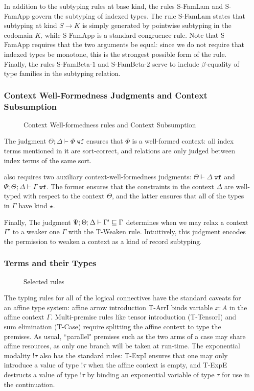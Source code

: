 In addition to the subtyping rules at base kind, the rules S-FamLam and S-FamApp govern the subtyping of indexed types. The rule S-FamLam states that subtyping at kind $S \to K$ is simply generated by pointwise subtyping in the codomain $K$, while S-FamApp is a standard congruence rule. Note that S-FamApp requires that the two arguments be equal: since we do not require that indexed types be monotone, this is the strongest possible form of the rule. Finally, the rules S-FamBeta-$1$ and S-FamBeta-$2$ serve to include $\beta$-equality of type families in the subtyping relation.

\subsubsection{Context Well-Formedness Judgments and Context Subsumption}
\begin{figure}

\caption{Context Well-formedness rules and Context Subsumption}
\label{fig:dlambdaamor-ctx-wf-rules}
\end{figure}
The judgment $\Theta ; \Delta \vdash \Phi \; \texttt{wf}$ ensures that $\Phi$ is a well-formed context: all index terms mentioned in it are sort-correct, and relations are only judged between index terms of the same sort.

\dlambdaamor also requires two auxiliary context-well-formedness judgments: $\Theta \vdash \Delta \; \texttt{wf}$ and $\Psi ; \Theta ; \Delta \vdash \Gamma \; \texttt{wf}$. The former ensures that the constraints in the context $\Delta$ are well-typed with respect to the context $\Theta$, and the latter ensures that all of the types in $\Gamma$ have kind $\star$.

Finally, The judgment $\Psi ; \Theta ; \Delta \vdash \Gamma' \sqsubseteq \Gamma$ determines when we may relax a context $\Gamma'$ to a weaker one $\Gamma$ with the T-Weaken rule. Intuitively, this judgment encodes the permission to weaken a context as a kind of record subtyping.


\subsubsection{Terms and their Types}
\begin{figure}

\caption{Selected \dlambdaamor rules}
\label{fig:dlambdaamor-selected-typing-rules}
\end{figure}

The typing rules for all of the logical connectives have the standard caveats for an affine type system: affine arrow introduction T-ArrI binds variable $x : A$ in the affine context $\Gamma$. Multi-premise rules like tensor introduction (T-TensorI) and sum elimination (T-Case) require splitting the affine context to type the premises. As usual, ``parallel" premises such as the two arms of a case may share affine resources, as only one branch will be taken at run-time. The exponential modality $!\tau$ also has the standard rules: T-ExpI ensures that one may only introduce a value of type $!\tau$ when the affine context is empty, and T-ExpE destructs a value of type $!\tau$ by binding an exponential variable of type $\tau$ for use in the continuation.

